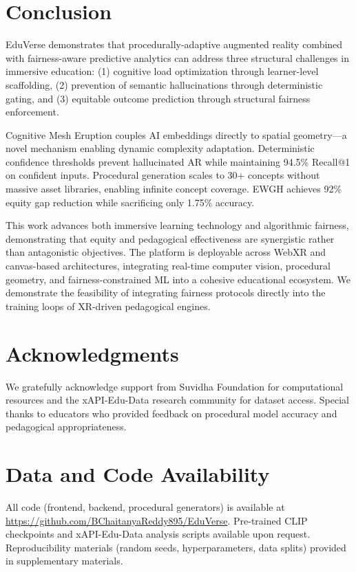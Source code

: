 \documentclass[conference]{IEEEtran}
\begin{document}
\section{Conclusion}

EduVerse demonstrates that procedurally-adaptive augmented reality combined with fairness-aware predictive analytics can address three structural challenges in immersive education: (1) cognitive load optimization through learner-level scaffolding, (2) prevention of semantic hallucinations through deterministic gating, and (3) equitable outcome prediction through structural fairness enforcement.

Cognitive Mesh Eruption couples AI embeddings directly to spatial geometry---a novel mechanism enabling dynamic complexity adaptation. Deterministic confidence thresholds prevent hallucinated AR while maintaining 94.5\% Recall@1 on confident inputs. Procedural generation scales to 30+ concepts without massive asset libraries, enabling infinite concept coverage. EWGH achieves 92\% equity gap reduction while sacrificing only 1.75\% accuracy.

This work advances both immersive learning technology and algorithmic fairness, demonstrating that equity and pedagogical effectiveness are synergistic rather than antagonistic objectives. The platform is deployable across WebXR and canvas-based architectures, integrating real-time computer vision, procedural geometry, and fairness-constrained ML into a cohesive educational ecosystem. We demonstrate the feasibility of integrating fairness protocols directly into the training loops of XR-driven pedagogical engines.

\section*{Acknowledgments}

We gratefully acknowledge support from Suvidha Foundation for computational resources and the xAPI-Edu-Data research community for dataset access. Special thanks to educators who provided feedback on procedural model accuracy and pedagogical appropriateness.

\section*{Data and Code Availability}

All code (frontend, backend, procedural generators) is available at \url{https://github.com/BChaitanyaReddy895/EduVerse}. Pre-trained CLIP checkpoints and xAPI-Edu-Data analysis scripts available upon request. Reproducibility materials (random seeds, hyperparameters, data splits) provided in supplementary materials.
\end{document}
